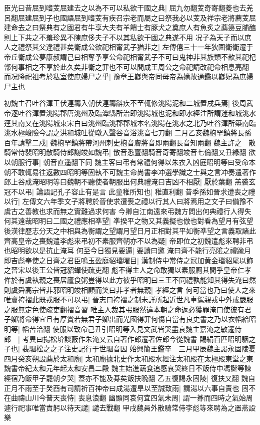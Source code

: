 臣光曰昔屈到嗜芰屈建去之以為不可以私欲干國之典|{
	屈九勿翻芰奇寄翻菱也去羌呂翻屈建屈到子也國語屈到嗜芰有疾召宗老而屬之曰祭我必以芰及祥宗老將薦芰屈建命去之曰祭典有之國君有牛享大夫有羊饋士有豚犬之奠庶人有魚炙之薦籩豆脯醢則上下共之不羞珍異不陳庶侈夫子不以其私欲干國之典遂不用}
况子為天子而以庶人之禮祭其父違禮甚矣衛成公欲祀相甯武子猶非之|{
	左傳僖三十一年狄圍衛衛遷于帝丘衛成公夢康叔謂己曰相奪予享公命祀相甯武子不可曰鬼神非其族類不歆其祀杞鄫何事相之不享於此久矣非衛之罪也不可以間成王周公之命祀請改祀命相息亮翻}
而况降祀祖考於私室使庶婦尸之乎|{
	豫章王嶷與帝同母帝為嫡故通鑑以嶷妃為庶婦尸主也}


初魏主召吐谷渾王伏連籌入朝伏連籌辭疾不至輒修洮陽泥和二城置戌兵焉|{
	後周武帝逐吐谷渾置洮陽郡唐洮州及臨潭縣所治即洮陽城也泥和即水經注所謂迷和城洮水逕其南又在洮陽城東宋白曰洮州臨洮郡郡城本名洮陽在洮水之北乃吐谷渾所築南臨洮水極峻險今謂之洪和城吐從暾入聲谷音浴洮音七刀翻}
二月乙亥魏枹罕鎮將長孫百年請擊二戍|{
	魏枹罕鎮將帶河州刺史枹音膚將音即兩翻長音知兩翻}
魏主許之　散騎常侍裴昭明散騎侍郎謝竣如魏弔|{
	散音悉亶翻騎音奇寄翻竣音七倫翻又丑緣翻}
欲以朝服行事|{
	朝音直遥翻下同}
魏主客曰弔有常禮何得以朱衣入凶庭昭明等曰受命本朝不敢輒易往返數四昭明等固執不可魏主命尚書李冲選學識之士與之言冲奏遣著作郎上谷成淹昭明等曰魏朝不聽使者朝服出何典禮淹曰吉凶不相厭|{
	厭於葉翻}
羔裘玄冠不以弔|{
	論語記孔子容止有是言}
此童稚所知也|{
	稚直利翻}
昔季孫如晉求遭喪之禮以行|{
	左傳文六年季文子將聘於晉使求遭喪之禮以行其人曰將焉用之文子曰備豫不虞古之善教也求而無之實難過求何害}
今卿自江南遠來弔魏方問出何典禮行人得失何其遠哉昭明曰二國之禮應相凖望|{
	凖揆平之物又其義擬也倣也對看為望月有弦望後漢律歷志分天之中相與為衡謂之望謂月望日月正相對其平如衡凖望之言義取諸此}
齊高皇帝之喪魏遣李彪來弔初不素服齊朝亦不以為疑|{
	帝即位之初魏遣彪來聘非弔也昭明欲以是抗止淹耳}
何至今日獨見要逼|{
	要讀曰邀}
淹曰齊不能行亮隂之禮踰月即吉彪奉使之日齊之君臣鳴玉盈庭貂璫曜目|{
	漢制侍中常侍之冠加黄金璫貂尾以飾之晉宋以後王公皆冠貂蟬使疏吏翻}
彪不得主人之命敢獨以素服厠其間乎皇帝仁孝侔於有虞執親之喪居廬食粥豈得以此方彼乎昭明曰三王不同禮孰能知其得失淹曰然則虞舜高宗皆非邪昭明竣相顧而笑曰非孝者無親|{
	孝經之言}
何可當也乃曰使人之來唯齎袴褶此既戎服不可以弔|{
	晉志曰袴褶之制未詳所起近世凡車駕親戎中外戒嚴服之服無定色使疏吏翻褶音習}
唯主人裁其弔服然違本朝之命返必獲罪淹曰使彼有君子卿將命得宜且有厚賞若無君子卿出而光國得罪何傷自當有良史書之乃以衣幍給昭明等|{
	幍苦洽翻}
使服以致命己丑引昭明等入見文武皆哭盡哀魏主嘉淹之敏遷侍郎　|{
	考異曰揚松圿談藪作朱淹又云自著作郎遷著佐郎今從魏書}
賜絹百匹昭明駰之子也|{
	裴駰松之之子注史記行于世駰音因}
始興簡王鑑卒　三月甲辰魏主謁永固陵夏四月癸亥朔設薦於太和廟|{
	太和廟據北史作太和殿水經注太和殿在太極殿東堂之東魏書帝紀太和元年起太和安昌二殿}
魏主始進蔬食追感哀哭終日不飯侍中馮誕等諫經宿乃飯甲子罷朝夕哭|{
	蓋亦不能及朞矣飯扶晩翻}
乙五復謁永固陵|{
	復扶又翻}
魏自正月不雨至于癸酉有司請祈百神帝曰成湯遭旱以至誠致雨|{
	謂湯以六事自責也}
固不在曲禱山川今普天喪恃|{
	喪息浪翻}
幽顯同哀何宜四氣未周|{
	謂一朞而四時之氣始周}
遽行祀事唯當責躬以待天譴|{
	譴去戰翻}
甲戌魏員外散騎常侍李彪等來聘為之置燕設樂

